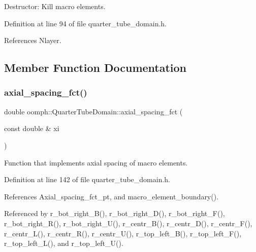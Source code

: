 Destructor\+: Kill macro elements. 



Definition at line 94 of file quarter\+\_\+tube\+\_\+domain.\+h.



References Nlayer.



\subsection{Member Function Documentation}
\mbox{\label{classoomph_1_1QuarterTubeDomain_a3574feea9f42e4ec95b6edec36da245a}} 
\subsubsection{\texorpdfstring{axial\+\_\+spacing\+\_\+fct()}{axial\_spacing\_fct()}}
{\footnotesize\ttfamily double oomph\+::\+Quarter\+Tube\+Domain\+::axial\+\_\+spacing\+\_\+fct (\begin{DoxyParamCaption}\item[{const double \&}]{xi }\end{DoxyParamCaption})\hspace{0.3cm}{\ttfamily [inline]}}



Function that implements axial spacing of macro elements. 



Definition at line 142 of file quarter\+\_\+tube\+\_\+domain.\+h.



References Axial\+\_\+spacing\+\_\+fct\+\_\+pt, and macro\+\_\+element\+\_\+boundary().



Referenced by r\+\_\+bot\+\_\+right\+\_\+\+B(), r\+\_\+bot\+\_\+right\+\_\+\+D(), r\+\_\+bot\+\_\+right\+\_\+\+F(), r\+\_\+bot\+\_\+right\+\_\+\+R(), r\+\_\+bot\+\_\+right\+\_\+\+U(), r\+\_\+centr\+\_\+\+B(), r\+\_\+centr\+\_\+\+D(), r\+\_\+centr\+\_\+\+F(), r\+\_\+centr\+\_\+\+L(), r\+\_\+centr\+\_\+\+R(), r\+\_\+centr\+\_\+\+U(), r\+\_\+top\+\_\+left\+\_\+\+B(), r\+\_\+top\+\_\+left\+\_\+\+F(), r\+\_\+top\+\_\+left\+\_\+\+L(), and r\+\_\+top\+\_\+left\+\_\+\+U().

